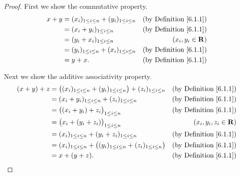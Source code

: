 \begin{proof}
    First we show the commutative property.
    \begin{align*}
        x + y & = (x_i)_{1 \leq i \leq n} + (y_i)_{1 \leq i \leq n} & \text{(by Definition \ref{6.1.1})} \\
              & = (x_i + y_i)_{1 \leq i \leq n}                     & \text{(by Definition \ref{6.1.1})} \\
              & = (y_i + x_i)_{1 \leq i \leq n}                     & (x_i, y_i \in \mathbf{R})          \\
              & = (y_i)_{1 \leq i \leq n} + (x_i)_{1 \leq i \leq n} & \text{(by Definition \ref{6.1.1})} \\
              & = y + x.                                            & \text{(by Definition \ref{6.1.1})}
    \end{align*}

    Next we show the additive associativity property.
    \begin{align*}
        (x + y) + z & = \big((x_i)_{1 \leq i \leq n} + (y_i)_{1 \leq i \leq n}\big) + (z_i)_{1 \leq i \leq n} & \text{(by Definition \ref{6.1.1})} \\
                    & = (x_i + y_i)_{1 \leq i \leq n} + (z_i)_{1 \leq i \leq n}                               & \text{(by Definition \ref{6.1.1})} \\
                    & = \big((x_i + y_i) + z_i\big)_{1 \leq i \leq n}                                         & \text{(by Definition \ref{6.1.1})} \\
                    & = \big(x_i + (y_i + z_i)\big)_{1 \leq i \leq n}                                         & (x_i, y_i, z_i \in \mathbf{R})     \\
                    & = (x_i)_{1 \leq i \leq n} + (y_i + z_i)_{1 \leq i \leq n}                               & \text{(by Definition \ref{6.1.1})} \\
                    & = (x_i)_{1 \leq i \leq n} + \big((y_i)_{1 \leq i \leq n} + (z_i)_{1 \leq i \leq n}\big) & \text{(by Definition \ref{6.1.1})} \\
                    & = x + (y + z).                                                                          & \text{(by Definition \ref{6.1.1})}
    \end{align*}


\end{proof}
